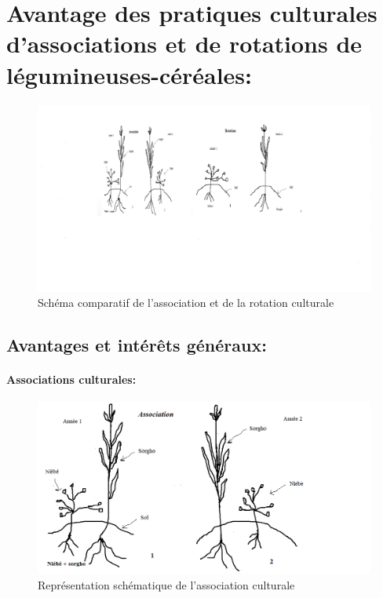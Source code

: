 \documentclass[a4paper,11pt]{article}
\begin{document}
\section{Avantage des pratiques culturales d'associations et de rotations de légumineuses-céréales:}



\begin{figure}%
 \begin{center}
   \includegraphics[width=20cm]{images/AssociationRotation}
  \end{center}
  \caption{Schéma comparatif de l’association et de la rotation culturale}
\end{figure}

\subsection{ Avantages et intérêts généraux:}

\paragraph{Associations culturales:}


\begin{figure}%
 \begin{center}
  \includegraphics[width=18cm]{images/Association}
 \end{center}
  \caption{ Représentation schématique de l’association culturale}
\end{figure}
\end{document}
